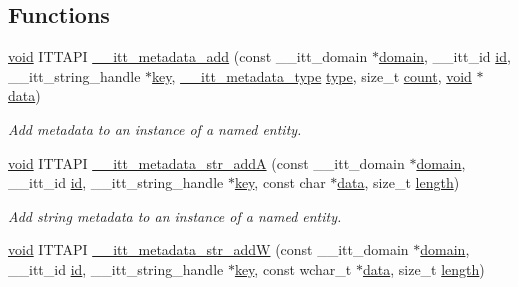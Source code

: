 \subsection*{Functions}
\begin{DoxyCompactItemize}
\item 
\hyperlink{ittnotify__static_8h_af941d56e55e3c5465135b60c4d6343ed}{void} I\-T\-T\-A\-P\-I \hyperlink{group__metadata_ga1acb78b07e5c93582ee1974bf8073038}{\-\_\-\-\_\-itt\-\_\-metadata\-\_\-add} (const \-\_\-\-\_\-itt\-\_\-domain $\ast$\hyperlink{ittnotify__static_8h_ae4bc3459cfd348603d57d87ede15591b}{domain}, \-\_\-\-\_\-itt\-\_\-id \hyperlink{ittnotify__static_8h_a9ebeaf6e841ab2e3ed2f92a8850e0c3d}{id}, \-\_\-\-\_\-itt\-\_\-string\-\_\-handle $\ast$\hyperlink{ittnotify__static_8h_af4f22e9c530f1bf5618220b2627b8f02}{key}, \hyperlink{group__metadata_ga906320efadd24c37fc2ee021e880a673}{\-\_\-\-\_\-itt\-\_\-metadata\-\_\-type} \hyperlink{ittnotify__static_8h_ad66c62ad96ed5fc5b56ae47779013f23}{type}, size\-\_\-t \hyperlink{ittnotify__static_8h_a9da14338c9c3be6f21c41cf4ec79eaf1}{count}, \hyperlink{ittnotify__static_8h_af941d56e55e3c5465135b60c4d6343ed}{void} $\ast$\hyperlink{ittnotify__static_8h_ae4b7aa9cddc8e1ade7c67ed7e338b18f}{data})
\begin{DoxyCompactList}\small\item\em Add metadata to an instance of a named entity. \end{DoxyCompactList}\item 
\hyperlink{ittnotify__static_8h_af941d56e55e3c5465135b60c4d6343ed}{void} I\-T\-T\-A\-P\-I \hyperlink{group__metadata_ga1c0cbd4717ce08bf6a83fc84bf0a58e2}{\-\_\-\-\_\-itt\-\_\-metadata\-\_\-str\-\_\-add\-A} (const \-\_\-\-\_\-itt\-\_\-domain $\ast$\hyperlink{ittnotify__static_8h_ae4bc3459cfd348603d57d87ede15591b}{domain}, \-\_\-\-\_\-itt\-\_\-id \hyperlink{ittnotify__static_8h_a9ebeaf6e841ab2e3ed2f92a8850e0c3d}{id}, \-\_\-\-\_\-itt\-\_\-string\-\_\-handle $\ast$\hyperlink{ittnotify__static_8h_af4f22e9c530f1bf5618220b2627b8f02}{key}, const char $\ast$\hyperlink{ittnotify__static_8h_ae4b7aa9cddc8e1ade7c67ed7e338b18f}{data}, size\-\_\-t \hyperlink{ittnotify__static_8h_ac53a0c6bfc9a2eca64ad3e517d9d6b0b}{length})
\begin{DoxyCompactList}\small\item\em Add string metadata to an instance of a named entity. \end{DoxyCompactList}\item 
\hyperlink{ittnotify__static_8h_af941d56e55e3c5465135b60c4d6343ed}{void} I\-T\-T\-A\-P\-I \hyperlink{group__metadata_ga53baf7d63f0b91a61d4b7ea9c8a6f09d}{\-\_\-\-\_\-itt\-\_\-metadata\-\_\-str\-\_\-add\-W} (const \-\_\-\-\_\-itt\-\_\-domain $\ast$\hyperlink{ittnotify__static_8h_ae4bc3459cfd348603d57d87ede15591b}{domain}, \-\_\-\-\_\-itt\-\_\-id \hyperlink{ittnotify__static_8h_a9ebeaf6e841ab2e3ed2f92a8850e0c3d}{id}, \-\_\-\-\_\-itt\-\_\-string\-\_\-handle $\ast$\hyperlink{ittnotify__static_8h_af4f22e9c530f1bf5618220b2627b8f02}{key}, const wchar\-\_\-t $\ast$\hyperlink{ittnotify__static_8h_ae4b7aa9cddc8e1ade7c67ed7e338b18f}{data}, size\-\_\-t \hyperlink{ittnotify__static_8h_ac53a0c6bfc9a2eca64ad3e517d9d6b0b}{length})

\end{DoxyCompactItemize}
